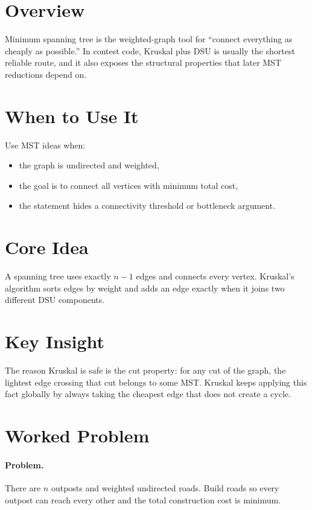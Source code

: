 \section*{Overview}

Minimum spanning tree is the weighted-graph tool for ``connect everything as cheaply as possible.'' In contest code,
Kruskal plus DSU is usually the shortest reliable route, and it also exposes the structural properties that later MST
reductions depend on.

\section*{When to Use It}

Use MST ideas when:

\begin{itemize}
  \item the graph is undirected and weighted,
  \item the goal is to connect all vertices with minimum total cost,
  \item the statement hides a connectivity threshold or bottleneck argument.
\end{itemize}

\section*{Core Idea}

A spanning tree uses exactly \(n-1\) edges and connects every vertex. Kruskal's algorithm sorts edges by weight and
adds an edge exactly when it joins two different DSU components.

\section*{Key Insight}

The reason Kruskal is safe is the cut property: for any cut of the graph, the lightest edge crossing that cut belongs to
some MST. Kruskal keeps applying this fact globally by always taking the cheapest edge that does not create a cycle.

\section*{Worked Problem}

\paragraph{Problem.}
There are \(n\) outposts and weighted undirected roads. Build roads so every outpost can reach every other and the total
construction cost is minimum.


